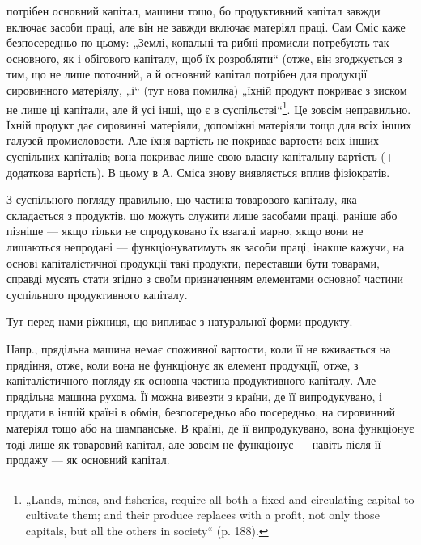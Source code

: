 \parcont{}  %
потрібен основний капітал, машини тощо, бо продуктивний капітал завжди
включає засоби праці, але він не завжди включає матеріял праці. Сам
Сміс каже безпосередньо по цьому: „Землі, копальні та рибні промисли
потребують так основного, як і обігового капіталу, щоб їх розробляти“
(отже, він згоджується з тим, що не лише поточний, а й основний капітал
потрібен для продукції сировинного матеріялу, „і“ (тут нова помилка)
„їхній продукт покриває з зиском не лише ці капітали, але й усі
інші, що є в суспільстві“\footnote*{
„Lands, mines, and fisheries, require all both a fixed and circulating capital
to cultivate them; and their produce replaces with a profit, not only those capitals,
but all the others in society“ (p. 188).
}. Це зовсім неправильно. Їхній продукт
дає сировинні матеріяли, допоміжні матеріяли тощо для всіх інших галузей
промисловости. Але їхня вартість не покриває вартости всіх інших
суспільних капіталів; вона покриває лише свою власну капітальну вартість
(+ додаткова вартість). В цьому в А. Сміса знову виявляється
вплив фізіократів.

З суспільного погляду правильно, що частина товарового капіталу,
яка складається з продуктів, що можуть служити лише засобами праці,
раніше або пізніше — якщо тільки не спродуковано їх взагалі марно,
якщо вони не лишаються непродані — функціонуватимуть як засоби праці;
інакше кажучи, на основі капіталістичної продукції такі продукти,
переставши бути товарами, справді мусять стати згідно з своїм призначенням
елементами основної частини суспільного продуктивного капіталу.

Тут перед нами ріжниця, що випливає з натуральної форми продукту.

Напр., прядільна машина немає споживної вартости, коли її не вживається
на прядіння, отже, коли вона не функціонує як елемент продукції,
отже, з капіталістичного погляду як основна частина продуктивного
капіталу. Але прядільна машина рухома. Її можна вивезти з країни, де
її випродукувано, і продати в іншій країні в обмін, безпосередньо або
посередньо, на сировинний матеріял тощо або на шампанське. В країні,
де її випродукувано, вона функціонує тоді лише як товаровий капітал,
але зовсім не функціонує — навіть після її продажу — як основний капітал.

